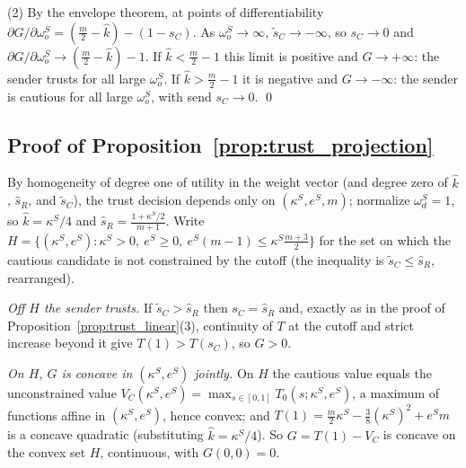 \documentclass[11pt]{article}
\theoremstyle{plain}
\theoremstyle{remark}
\begin{document}
(2) By the envelope theorem, at points of differentiability $\partial G/\partial\omega_o^S=(\tfrac m2-\hat k)-(1-s_C)$.  As $\omega_o^S\to\infty$, $\tilde s_C\to-\infty$, so $s_C\to0$ and $\partial G/\partial\omega_o^S\to(\tfrac m2-\hat k)-1$.  If $\hat k<\tfrac m2-1$ this limit is positive and $G\to+\infty$: the sender trusts for all large $\omega_o^S$.  If $\hat k>\tfrac m2-1$ it is negative and $G\to-\infty$: the sender is cautious for all large $\omega_o^S$, with send $s_C\to0$.
\qed

\subsection*{Proof of Proposition~\ref{prop:trust_projection}}

By homogeneity of degree one of utility in the weight vector (and degree zero of $\hat k$, $\hat s_R$, and $\tilde s_C$), the trust decision depends only on $(\kappa^S,e^S,m)$; normalize $\omega_d^S=1$, so $\hat k=\kappa^S/4$ and $\hat s_R=\frac{1+\kappa^S/2}{m+1}$.  Write $H=\{(\kappa^S,e^S):\kappa^S>0,\ e^S\ge0,\ e^S(m-1)\le \kappa^S\tfrac{m+3}2\}$ for the set on which the cautious candidate is not constrained by the cutoff (the inequality is $\tilde s_C\le\hat s_R$, rearranged).

\emph{Off $H$ the sender trusts.}  If $\tilde s_C>\hat s_R$ then $s_C=\hat s_R$ and, exactly as in the proof of Proposition~\ref{prop:trust_linear}(3), continuity of $T$ at the cutoff and strict increase beyond it give $T(1)>T(s_C)$, so $G>0$.

\emph{On $H$, $G$ is concave in $(\kappa^S,e^S)$ jointly.}  On $H$ the cautious value equals the unconstrained value $V_C(\kappa^S,e^S)=\max_{s\in[0,1]}T_0(s;\kappa^S,e^S)$, a maximum of functions affine in $(\kappa^S,e^S)$, hence convex; and $T(1)=\tfrac m2\kappa^S-\tfrac38(\kappa^S)^2+e^Sm$ is a concave quadratic (substituting $\hat k=\kappa^S/4$).  So $G=T(1)-V_C$ is concave on the convex set $H$, continuous, with $G(0,0)=0$.
\end{document}
